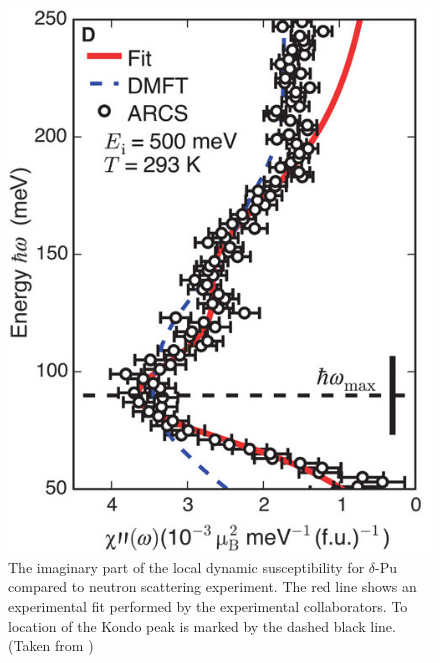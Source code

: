 \documentclass[10pt]{ruthesis}
\begin{document}
{\begin{figure}[H]
\begin{center}
\includegraphics[scale=0.5]{Pu_susc_cropped.jpg}
\caption{ The imaginary part of the local dynamic susceptibility for $\delta$-Pu compared to neutron scattering experiment. The red line shows an experimental fit performed by the experimental collaborators. To location of the Kondo peak is marked by the dashed black line. (Taken from \cite{Me_Pu}) }
\label{Susc_Pu}
\end{center}
\end{figure}

}
\end{document}
